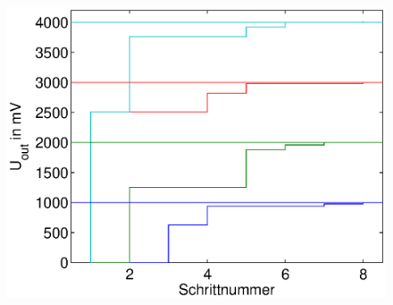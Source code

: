 \begin{frame}
\begin{columns}[c]
\begin{figure}[H]
            \begin{center}
                    \includegraphics[scale=0.25]{./img/graph/Aufgabe2a.eps}
            \end{center}
            \end{figure}
    \end{columns}
\end{frame}

